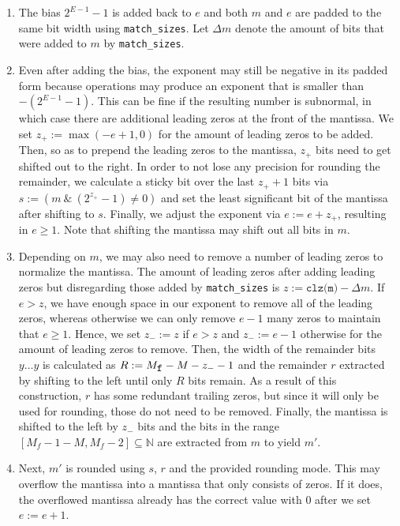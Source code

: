 \documentclass[a4paper,UKenglish,cleveref, autoref, thm-restate]{lipics-v2019}
\begin{document}
\begin{enumerate}
	\item The bias $2^{E-1}-1$ is added back to $e$ and both $m$ and $e$ are padded to the same bit width using \verb|match_sizes|. Let $\Delta m$ denote the amount of bits that were added to $m$ by \verb|match_sizes|.
	\item Even after adding the bias, the exponent may still be negative in its padded form because operations may produce an exponent that is smaller than $-(2^{E-1}-1)$. This can be fine if the resulting number is subnormal, in which case there are additional leading zeros at the front of the mantissa. We set $z_+ := \max(-e + 1, 0)$ for the amount of leading zeros to be added. Then, so as to prepend the leading zeros to the mantissa, $z_+$ bits need to get shifted out to the right. In order to not lose any precision for rounding the remainder, we calculate a sticky bit over the last $z_+ + 1$ bits via $s := (m\ \&\ (2^{z_+} - 1) \neq 0)$ and set the least significant bit of the mantissa after shifting to $s$. Finally, we adjust the exponent via $e := e + z_+$, resulting in $e \geq 1$. Note that shifting the mantissa may shift out all bits in $m$.
	\item Depending on $m$, we may also need to remove a number of leading zeros to normalize the mantissa. The amount of leading zeros after adding leading zeros but disregarding those added by \verb|match_sizes| is $z := \texttt{clz(m)} - \Delta m$. If $e > z$, we have enough space in our exponent to remove all of the leading zeros, whereas otherwise we can only remove $e - 1$ many zeros to maintain that $e \geq 1$. Hence, we set $z_- := z$ if $e > z$ and $z_- := e - 1$ otherwise for the amount of leading zeros to remove. Then, the width of the remainder bits $y \dots y$ is calculated as $R := M_{\verb|f|} - M - z_- - 1$ and the remainder $r$ extracted by shifting to the left until only $R$ bits remain. As a result of this construction, $r$ has some redundant trailing zeros, but since it will only be used for rounding, those do not need to be removed. Finally, the mantissa is shifted to the left by $z_-$ bits and the bits in the range $[M_f-1-M, M_f-2] \subseteq \mathbb{N}$ are extracted from $m$ to yield $m'$.
	\item Next, $m'$ is rounded using $s$, $r$ and the provided rounding mode. This may overflow the mantissa into a mantissa that only consists of zeros. If it does, the overflowed mantissa already has the correct value with $0$ after we set $e := e + 1$.

\end{enumerate}
\end{document}
